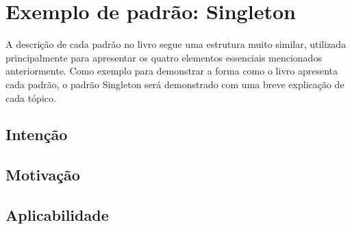 
\section{Exemplo de padrão: Singleton}

A descrição de cada padrão no livro segue uma estrutura 
muito similar, utilizada principalmente para apresentar 
os quatro elementos essenciais mencionados anteriormente. 
Como exemplo para demonstrar a forma como o livro 
apresenta cada padrão, o padrão Singleton será 
demonstrado com uma breve explicação de cada tópico.

\subsection{Intenção}

\subsection{Motivação}

\subsection{Aplicabilidade}

